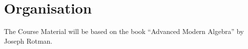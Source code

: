 \section{Organisation}


The Course Material will be based on the book ``Advanced Modern Algebra'' by Joseph Rotman.
